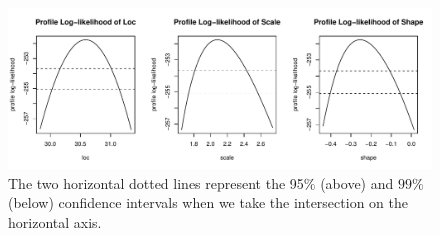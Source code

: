 \documentclass[11pt,a4paper,openany ]{book}
\begin{document}
\begin{figure}[!htb]
\centering	\includegraphics[width=.85\linewidth]{proflikpar.pdf}\caption{ The two horizontal dotted lines represent the 95$\%$ (above) and $99\%$ (below) confidence intervals when we take the intersection on the horizontal axis. }\label{fig:proflikpar}
\end{figure}

\end{document}
